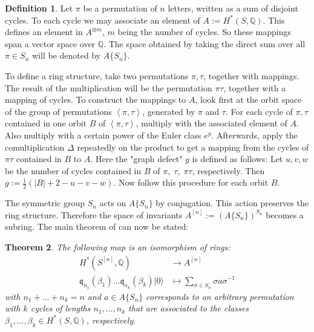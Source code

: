 \documentclass{amsart}
\newcommand{\hilb}[1]{^{[#1]}}
\newcommand{\vac}{|0\rangle}
\newcommand{\IQ}{\mathbb{Q}}
\newcommand{\kq}{\mathfrak{q}}
\theoremstyle{plain}
\newtheorem{theorem}{Theorem}[section]
\theoremstyle{definition}
\newtheorem{definition}[theorem]{Definition}
\theoremstyle{remark}
\begin{document}
\begin{definition} \cite[Sect. 2]{LehnSorger}
Let $\pi$ be a permutation of $n$ letters, written as a sum of disjoint cycles. To each cycle we may associate an element of $A:=H^\ast(S,\IQ)$. This defines an element in $A^{\otimes m}$, $m$ being the number of cycles. So these mappings span a vector space over $\IQ$. The space obtained by taking the direct sum over all $\pi \in S_n$ will be denoted by $A\{S_n\}$. 

To define a ring structure, take two permutations $\pi,\tau$, together with mappings. The result of the multiplication will be the permutation $\pi\tau$, together with a mapping of cycles. To construct the mappings to $A$, look first at the orbit space of the group of permutations $\left<\pi,\tau\right>$, generated by $\pi$ and $\tau$. For each cycle of $\pi, \tau$ contained in one orbit $B$ of $\left<\pi,\tau\right>$, multiply with the associated element of $A$. Also multiply with a certain power of the Euler class $e^g$. Afterwards, apply the comultiplication $\Delta$ repeatedly on the product to get a mapping from the cycles of $\pi\tau$ contained in $B$ to $A$. 
Here the "graph defect" $g$ is defined as follows: Let $u,v,w$ be the number of cycles contained in $B$ of $\pi,\;\tau,\;\pi\tau$, respectively. Then $g:=\frac{1}{2}\left(|B| + 2- u-v-w\right)$. Now follow this procedure for each orbit $B$. 

\end{definition}
The symmetric group $S_n$ acts on $A\{S_n\}$ by conjugation. This action preserves the ring structure. Therefore the space of invariants $A\hilb{n} := \left(A\{S_n\} \right)^{S_n}$ becomes a subring. The main theorem of \cite{LehnSorger} can now be stated:
\begin{theorem} \cite[Thm. 3.2.]{LehnSorger}
The following map is an isomorphism of rings:
\begin{align*}
H^\ast(S\hilb{n},\IQ) & \longrightarrow A\hilb{n} \\
\kq_{n_1}(\beta_1)\ldots \kq_{n_k}(\beta_k) \vac &\longmapsto \sum_{\sigma\in S_n} \sigma a \sigma^{{-}1} 
\end{align*}
with $n_1+\ldots + n_k =n$ and $a\in A\{S_n\} $ corresponds to an arbitrary permutation with $k$ cycles of lengths $n_1,\ldots,n_k$ that are associated to the classes $\beta_1,\ldots,\beta_k \in H^\ast(S,\IQ)$, respectively.
\end{theorem}
\end{document}
